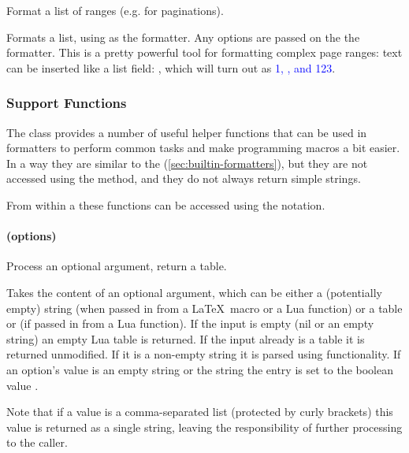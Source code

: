 \documentclass[12pt]{scrartcl}
\begin{document}
Format a list of ranges (e.g. for paginations).

Formats a list, using  as the formatter.  Any options are passed
on the the  formatter.  This is a pretty powerful tool for
formatting complex page ranges: text can be inserted like a 
list field:
\texttt{}, which will turn out as
\textcolor{blue}{1, ,  and 123}.%


\subsubsection{Support Functions}
\label{sec:defining:support-functions}

The  class provides a number of useful helper functions that
can be used in formatters to perform common tasks and make programming macros a
bit easier.  In a way they are similar to the  (\vref{sec:builtin-formatters}), but they are not accessed using the
 method, and they do not always return simple strings.

From within a  these functions can be accessed using the
 notation.


\paragraph{ (options)}

Process an optional argument, return a table.

\noindent Takes the content of an optional argument, which can be either a
(potentially empty) string (when passed in from a \LaTeX\ macro or a Lua
function) or a table or  (if passed in from a Lua function).  If the
input is empty (nil or an empty string) an empty Lua table is returned.  If the
input already is a table it is returned unmodified.  If it is a non-empty string
it is parsed using  functionality.  If an option's value
is an empty string or the string  the entry is set to the boolean
value .

Note that if a value is a comma-separated list (protected by curly brackets)
this value is returned as a single string, leaving the responsibility of further
processing to the caller.
\end{document}
